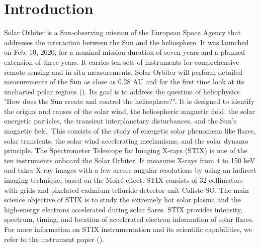 \documentclass[referee]{aa} %
\begin{document}
   \maketitle


\section{Introduction}
Solar Orbiter is a Sun-observing mission of the European Space Agency that 
addresses the interaction between the Sun and the heliosphere.
It was launched on Feb. 10, 2020, for a nominal mission duration of seven years and a planned 
extension of three years. It carries ten sets of instruments for comprehensive
remote-sensing and in-situ measurements. 
Solar Orbiter will perform detailed measurements of the Sun as close as 0.28 AU and for the first time look at its uncharted polar regions (\cite{SolarOrbiter2020}).  
Its goal is to address the question of heliophysics  "How does the Sun create and control the heliosphere?".  It is designed to identify the origins and causes of the solar wind, the heliospheric magnetic field, the solar energetic particles, the transient interplanetary disturbances, and the Sun's magnetic field.
This consists of the study of energetic solar phenomena like flares,  solar transients,  the solar wind accelerating mechanisms, and the solar dynamo principle.  
The Spectrometer Telescope for Imaging X-rays (STIX) is one of the ten instruments onboard the Solar Orbiter.  
It measures X-rays from 4 to 150 keV and takes X-ray images with a few arcsec angular resolutions by using an indirect imaging technique,
based on the Moiré effect.  STIX consists of 32 collimators with grids and pixelated cadmium telluride detector unit Caliste-SO. 
The main science objective of STIX is to study the extremely hot solar plasma and the high-energy electrons accelerated during solar flares. STIX provides intensity,  spectrum, timing, and location of accelerated electron information of solar flares.
For more information on STIX instrumentation and its scientific capabilities, we refer to the instrument paper (\cite{StixInstrument}).
\end{document}
